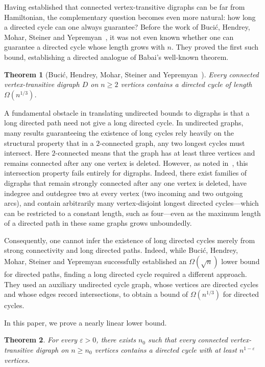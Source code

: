 \documentclass[11pt,a4paper,reqno]{amsart}
\newtheorem{theorem}{Theorem}[section]
\theoremstyle{definition}
\theoremstyle{remark}
\numberwithin{equation}{section}
\newcommand{\eps}{\varepsilon}
\begin{document}
Having established that connected vertex-transitive digraphs can be far from Hamiltonian, the complementary question becomes even more natural: how long a directed cycle can one always guarantee? Before the work of Buci\'c, Hendrey, Mohar, Steiner and Yepremyan~\cite{BHMSY}, it was not even known whether one can guarantee a directed cycle whose length grows with $n$. They proved the first such bound, establishing a directed analogue of Babai's well-known theorem.
\begin{theorem}[Buci\'c, Hendrey, Mohar, Steiner and Yepremyan~\cite{BHMSY}]
Every connected vertex-transitive digraph $D$ on $n\ge2$ vertices contains a directed cycle of length $\Omega(n^{1/3})$.
\end{theorem}

A fundamental obstacle in translating undirected bounds to digraphs is that a long directed path need not give a long directed cycle. In undirected graphs, many results guaranteeing the existence of long cycles rely heavily on the structural property that in a $2$-connected graph, any two longest cycles must intersect. Here $2$-connected means that the graph has at least three vertices and remains connected after any one vertex is deleted. However, as noted in~\cite{BHMSY}, this intersection property fails entirely for digraphs. Indeed, there exist families of digraphs that remain strongly connected after any one vertex is deleted, have indegree and outdegree two at every vertex (two incoming and two outgoing arcs), and contain arbitrarily many vertex-disjoint longest directed cycles---which can be restricted to a constant length, such as four---even as the maximum length of a directed path in these same graphs grows unboundedly.

Consequently, one cannot infer the existence of long directed cycles merely from strong connectivity and long directed paths. Indeed, while Buci\'c, Hendrey, Mohar, Steiner and Yepremyan successfully established an $\Omega(\sqrt n)$ lower bound for directed paths, finding a long directed cycle required a different approach. They used an auxiliary undirected cycle graph, whose vertices are directed cycles and whose edges record intersections, to obtain a bound of $\Omega(n^{1/3})$ for directed cycles.

In this paper, we prove a nearly linear lower bound.
\begin{theorem}\label{thm:main}
For every $\eps>0$, there exists $n_0$ such that every connected vertex-transitive digraph on $n\ge n_0$ vertices contains a directed cycle with at least $n^{1-\eps}$ vertices.
\end{theorem}
\end{document}
